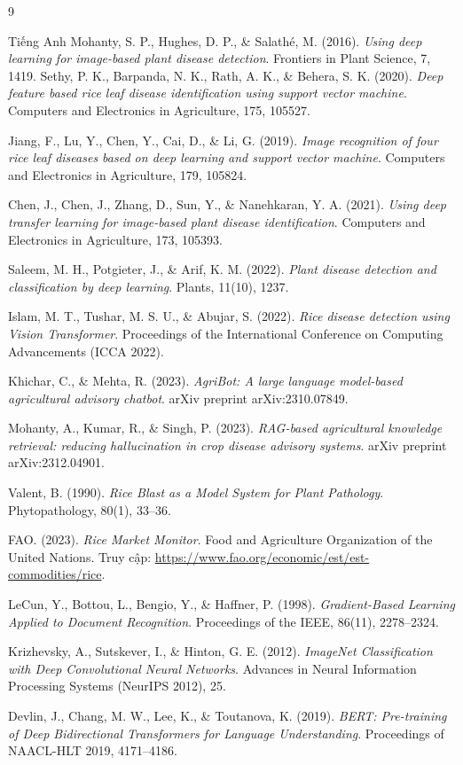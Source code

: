 \documentclass{uetgraduation}
\begin{document}
\begin{thebibliography}{9}
\begin{bibsection}{Tiếng Anh}
Mohanty, S. P., Hughes, D. P., \& Salath\'e, M. (2016). \textit{Using deep learning for image-based plant disease detection}. Frontiers in Plant Science, 7, 1419.
\newpage
{}
Sethy, P. K., Barpanda, N. K., Rath, A. K., \& Behera, S. K. (2020). \textit{Deep feature based rice leaf disease identification using support vector machine}. Computers and Electronics in Agriculture, 175, 105527.

Jiang, F., Lu, Y., Chen, Y., Cai, D., \& Li, G. (2019). \textit{Image recognition of four rice leaf diseases based on deep learning and support vector machine}. Computers and Electronics in Agriculture, 179, 105824.

Chen, J., Chen, J., Zhang, D., Sun, Y., \& Nanehkaran, Y. A. (2021). \textit{Using deep transfer learning for image-based plant disease identification}. Computers and Electronics in Agriculture, 173, 105393.

Saleem, M. H., Potgieter, J., \& Arif, K. M. (2022). \textit{Plant disease detection and classification by deep learning}. Plants, 11(10), 1237.

Islam, M. T., Tushar, M. S. U., \& Abujar, S. (2022). \textit{Rice disease detection using Vision Transformer}. Proceedings of the International Conference on Computing Advancements (ICCA 2022).

Khichar, C., \& Mehta, R. (2023). \textit{AgriBot: A large language model-based agricultural advisory chatbot}. arXiv preprint arXiv:2310.07849.

Mohanty, A., Kumar, R., \& Singh, P. (2023). \textit{RAG-based agricultural knowledge retrieval: reducing hallucination in crop disease advisory systems}. arXiv preprint arXiv:2312.04901.

Valent, B. (1990). \textit{Rice Blast as a Model System for Plant Pathology}. Phytopathology, 80(1), 33--36.

FAO. (2023). \textit{Rice Market Monitor}. Food and Agriculture Organization of the United Nations. Truy cập: \url{https://www.fao.org/economic/est/est-commodities/rice}.

LeCun, Y., Bottou, L., Bengio, Y., \& Haffner, P. (1998). \textit{Gradient-Based Learning Applied to Document Recognition}. Proceedings of the IEEE, 86(11), 2278--2324.

Krizhevsky, A., Sutskever, I., \& Hinton, G. E. (2012). \textit{ImageNet Classification with Deep Convolutional Neural Networks}. Advances in Neural Information Processing Systems (NeurIPS 2012), 25.

Devlin, J., Chang, M. W., Lee, K., \& Toutanova, K. (2019). \textit{BERT: Pre-training of Deep Bidirectional Transformers for Language Understanding}. Proceedings of NAACL-HLT 2019, 4171--4186.
\end{bibsection}
\end{thebibliography}
\appendix
\end{document}
